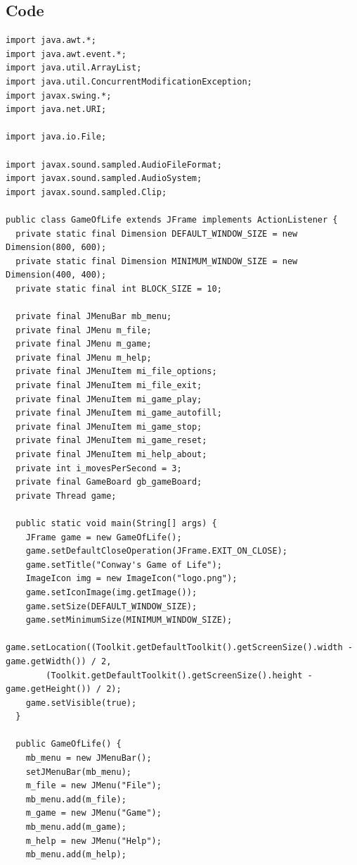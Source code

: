 \documentclass[12pt]{article}
\begin{document}
  \subsection*{Code}
  \begin{lstlisting}
import java.awt.*;
import java.awt.event.*;
import java.util.ArrayList;
import java.util.ConcurrentModificationException;
import javax.swing.*;
import java.net.URI;

import java.io.File;

import javax.sound.sampled.AudioFileFormat;
import javax.sound.sampled.AudioSystem;
import javax.sound.sampled.Clip;

public class GameOfLife extends JFrame implements ActionListener {
  private static final Dimension DEFAULT_WINDOW_SIZE = new Dimension(800, 600);
  private static final Dimension MINIMUM_WINDOW_SIZE = new Dimension(400, 400);
  private static final int BLOCK_SIZE = 10;

  private final JMenuBar mb_menu;
  private final JMenu m_file;
  private final JMenu m_game;
  private final JMenu m_help;
  private final JMenuItem mi_file_options;
  private final JMenuItem mi_file_exit;
  private final JMenuItem mi_game_play;
  private final JMenuItem mi_game_autofill;
  private final JMenuItem mi_game_stop;
  private final JMenuItem mi_game_reset;
  private final JMenuItem mi_help_about;
  private int i_movesPerSecond = 3;
  private final GameBoard gb_gameBoard;
  private Thread game;

  public static void main(String[] args) {
    JFrame game = new GameOfLife();
    game.setDefaultCloseOperation(JFrame.EXIT_ON_CLOSE);
    game.setTitle("Conway's Game of Life");
    ImageIcon img = new ImageIcon("logo.png");
    game.setIconImage(img.getImage());
    game.setSize(DEFAULT_WINDOW_SIZE);
    game.setMinimumSize(MINIMUM_WINDOW_SIZE);
    game.setLocation((Toolkit.getDefaultToolkit().getScreenSize().width - game.getWidth()) / 2,
        (Toolkit.getDefaultToolkit().getScreenSize().height - game.getHeight()) / 2);
    game.setVisible(true);
  }

  public GameOfLife() {
    mb_menu = new JMenuBar();
    setJMenuBar(mb_menu);
    m_file = new JMenu("File");
    mb_menu.add(m_file);
    m_game = new JMenu("Game");
    mb_menu.add(m_game);
    m_help = new JMenu("Help");
    mb_menu.add(m_help);


\end{lstlisting}
\end{document}
